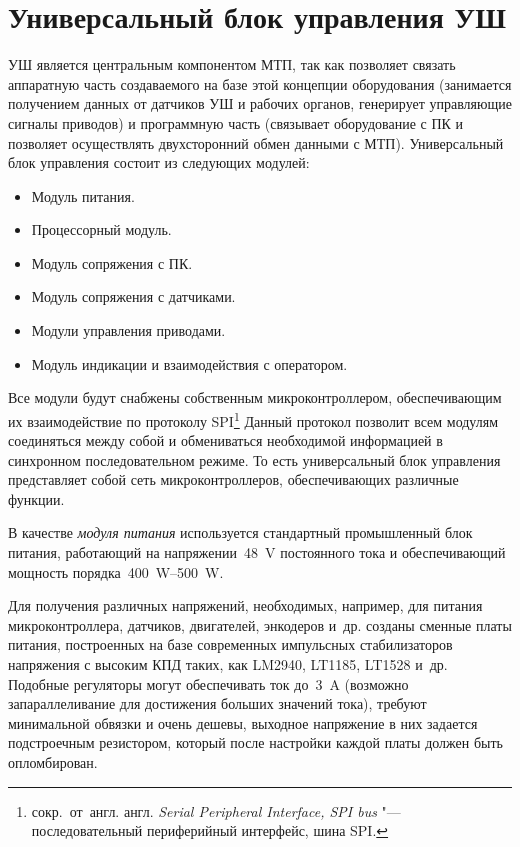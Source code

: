 \section{Универсальный блок управления УШ}


УШ является центральным компонентом МТП, так как позволяет связать аппаратную часть создаваемого на базе этой концепции оборудования (занимается получением данных от датчиков УШ и рабочих органов, генерирует управляющие сигналы приводов) и программную часть (связывает оборудование с ПК и позволяет осуществлять двухсторонний обмен данными с МТП). Универсальный блок управления состоит из следующих модулей:

\begin{itemize}
	\item Модуль питания.
	\item Процессорный модуль.
	\item Модуль сопряжения с ПК.
	\item Модуль сопряжения с датчиками.
	\item Модули управления приводами.
	\item Модуль индикации и взаимодействия с оператором.
\end{itemize}

Все модули будут снабжены собственным микроконтроллером, обеспечивающим их взаимодействие по протоколу \foreignlanguage{english}{SPI}\footnote{сокр.~от~англ. англ. \textit{Serial Peripheral Interface, SPI bus} "--- последовательный периферийный интерфейс, шина SPI.} Данный протокол позволит всем модулям соединяться между собой и обмениваться необходимой информацией в синхронном последовательном режиме. То есть универсальный блок управления представляет собой сеть микроконтроллеров, обеспечивающих различные функции.

В качестве \textit{модуля питания} используется стандартный промышленный блок питания, работающий на напряжении~\SI{48}{\volt} постоянного тока и обеспечивающий мощность порядка~\SIrange{400}{500}{\watt}.

Для получения различных напряжений, необходимых, например, для питания микроконтроллера, датчиков, двигателей, энкодеров и~др. созданы сменные платы питания, построенных на базе современных импульсных стабилизаторов напряжения с высоким КПД таких, как LM2940, LT1185, LT1528 и~др. Подобные регуляторы могут обеспечивать ток до~\SI{3}{\ampere} (возможно запараллеливание для достижения больших значений тока), требуют минимальной обвязки и очень дешевы, выходное напряжение в них задается подстроечным резистором, который после настройки каждой платы должен быть опломбирован.

